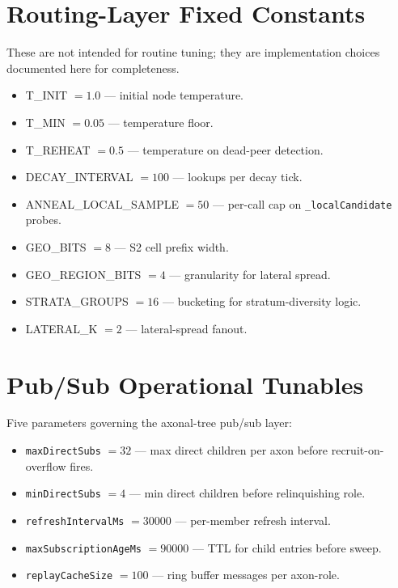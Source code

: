 \documentclass[twoside,nobib]{tufte-book}
\begin{document}
\section{Routing-Layer Fixed Constants}

These are not intended for routine tuning; they are
implementation choices documented here for completeness.

\begin{itemize}\setlength\itemsep{0.1em}
  \item \textsc{T\_INIT} $= 1.0$ --- initial node temperature.
  \item \textsc{T\_MIN} $= 0.05$ --- temperature floor.
  \item \textsc{T\_REHEAT} $= 0.5$ --- temperature on dead-peer
    detection.
  \item \textsc{DECAY\_INTERVAL} $= 100$ --- lookups per decay
    tick.
  \item \textsc{ANNEAL\_LOCAL\_SAMPLE} $= 50$ --- per-call cap
    on \texttt{\_localCandidate} probes.
  \item \textsc{GEO\_BITS} $= 8$ --- S2 cell prefix width.
  \item \textsc{GEO\_REGION\_BITS} $= 4$ --- granularity for
    lateral spread.
  \item \textsc{STRATA\_GROUPS} $= 16$ --- bucketing for
    stratum-diversity logic.
  \item \textsc{LATERAL\_K} $= 2$ --- lateral-spread fanout.
\end{itemize}

\section{Pub/Sub Operational Tunables}

Five parameters governing the axonal-tree pub/sub layer:

\begin{itemize}\setlength\itemsep{0.1em}
  \item \texttt{maxDirectSubs} $= 32$ --- max direct children
    per axon before recruit-on-overflow fires.
  \item \texttt{minDirectSubs} $= 4$ --- min direct children
    before relinquishing role.
  \item \texttt{refreshIntervalMs} $= 30000$ --- per-member
    refresh interval.
  \item \texttt{maxSubscriptionAgeMs} $= 90000$ --- TTL for
    child entries before sweep.
  \item \texttt{replayCacheSize} $= 100$ --- ring buffer
    messages per axon-role.
\end{itemize}
\end{document}
